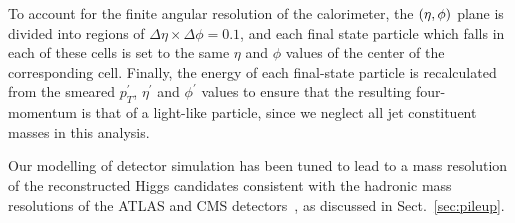 To account for the finite angular resolution of the calorimeter,
the $\left( \eta,\phi\right)$ plane is divided into regions of
$\Delta \eta \times \Delta \phi=0.1$, and each final state particle
which falls in each of these cells is set to the same $\eta$
and $\phi$ values of the center of the
corresponding cell.
%
Finally, the energy
of each final-state particle
is recalculated from the smeared $p_T^\prime$,
$\eta^\prime$ and $\phi^\prime$ values to ensure that the resulting
four-momentum is that of a light-like particle, since we neglect all
jet constituent masses in this analysis.


Our modelling of detector simulation has been tuned
to lead to a mass resolution of
the reconstructed Higgs candidates consistent
with the hadronic mass resolutions of the
ATLAS and CMS detectors~\cite{Aad:2012gxa,Chatrchyan:2013zna,Aad:2014xzb},
as discussed in Sect.~\ref{sec:pileup}.

%
